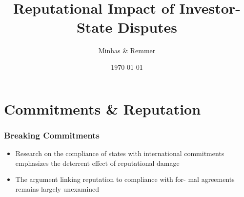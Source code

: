 \documentclass[10pt]{beamer}
\title[Contingent Institutions \hspace{14em} \insertframenumber/
\inserttotalframenumber]{Reputational Impact of Investor-State Disputes}
\author{Minhas \& Remmer}
\institute[Duke University]
{
{\emph{sfm12@duke.edu}} \\
\medskip
Duke University 
}
\date{\today}
\begin{document}
\begin{frame}
\titlepage
\end{frame}

\section{Commitments \& Reputation}

\begin{frame}
\frametitle{Breaking Commitments}

\begin{itemize}
	\item Research on the compliance of states with international commitments emphasizes the deterrent effect of reputational damage
	\item The argument linking reputation to compliance with for- mal agreements remains largely unexamined
\end{itemize}

\end{frame}
\end{document}

